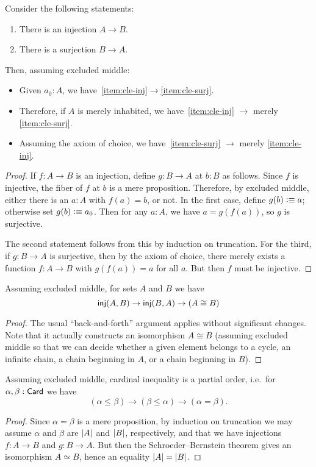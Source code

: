 \begin{lem}\label{thm:injsurj}
  Consider the following statements:
  \begin{enumerate}
  \item There is an injection $A\to B$.\label{item:cle-inj}
  \item There is a surjection $B\to A$.\label{item:cle-surj}
  \end{enumerate}
  Then, assuming excluded middle:
  \begin{itemize}
  \item Given $a_0:A$, we have~\ref{item:cle-inj}$\to$\ref{item:cle-surj}.
  \item Therefore, if $A$ is merely inhabited, we have~\ref{item:cle-inj} $\to$ merely \ref{item:cle-surj}.
  \item Assuming the axiom of choice, we have~\ref{item:cle-surj} $\to$ merely \ref{item:cle-inj}.
  \end{itemize}
\end{lem}
\begin{proof}
  If $f:A\to B$ is an injection, define $g:B\to A$ at $b:B$ as follows.
  Since $f$ is injective, the fiber of $f$ at $b$ is a mere proposition.
  Therefore, by excluded middle, either there is an $a:A$ with $f(a)=b$, or not.
  In the first case, define $g(b)\vcentcolon\equiv a$; otherwise set $g(b)\vcentcolon\equiv a_0$.
  Then for any $a:A$, we have $a = g(f(a))$, so $g$ is surjective.

  The second statement follows from this by induction on truncation.
  For the third, if $g:B\to A$ is surjective, then by the axiom of choice, there merely exists a function $f:A\to B$ with $g(f(a)) = a$ for all $a$.
  But then $f$ must be injective.
\end{proof}

\begin{thm}
  Assuming excluded middle, for sets $A$ and $B$ we have
  \[ \mathsf{inj}(A,B) \to \mathsf{inj}(B,A) \to (A\cong B) \]
\end{thm}
\begin{proof}
  The usual ``back-and-forth'' argument applies without significant changes.
  Note that it actually constructs an isomorphism $A\cong B$ (assuming excluded middle so that we can decide whether a given element belongs to a cycle, an infinite chain, a chain beginning in $A$, or a chain beginning in $B$).
\end{proof}

\begin{cor}
  Assuming excluded middle, cardinal inequality is a partial order, i.e.\ for $\alpha,\beta:\mathsf{Card}$ we have
  \[ (\alpha\le\beta) \to (\beta\le\alpha) \to (\alpha=\beta). \]
\end{cor}
\begin{proof}
  Since $\alpha=\beta$ is a mere proposition, by induction on truncation we may assume $\alpha$ and $\beta$ are $\left|A\right|$ and $\left|B\right|$, respectively, and that we have injections $f:A\to B$ and $g:B\to A$.
  But then the Schroeder--Bernstein theorem gives an isomorphism $A\simeq B$, hence an equality $\left|A\right|=\left|B\right|$.
\end{proof}


